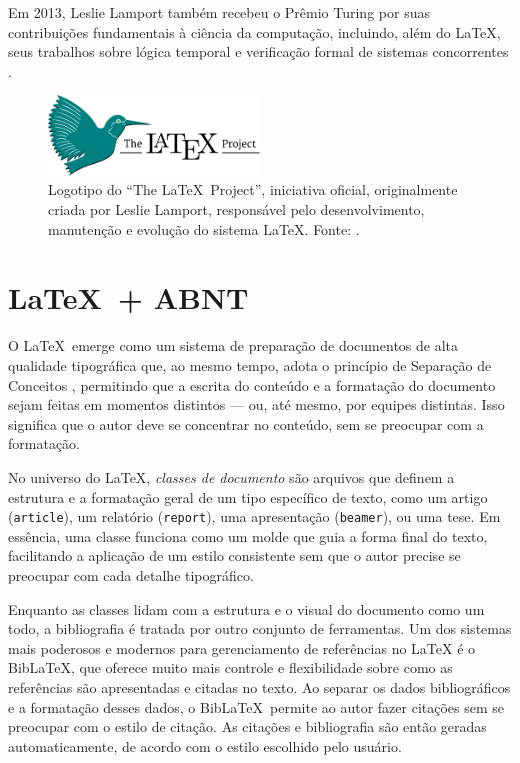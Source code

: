 Em 2013, Leslie Lamport também recebeu o Prêmio Turing por suas contribuições fundamentais à ciência da computação, incluindo, além do \LaTeX, seus trabalhos sobre lógica temporal e verificação formal de sistemas concorrentes \cite{LamportTuring2013}.

\begin{figure}
    \centering
    \includegraphics[width=0.5\textwidth]{img/LaTeX_project_logo.pdf}
    \caption{Logotipo do ``The \LaTeX\ Project'', iniciativa oficial, originalmente criada por Leslie Lamport, responsável pelo desenvolvimento, manutenção e evolução do sistema \LaTeX. Fonte: \textcite{LaTeXProjectLogo}.}
    \label{fig:latex-project-logo}
\end{figure}

\section{\LaTeX\ + ABNT} \label{sec:latex-abnt}

O \LaTeX\ emerge como um sistema de preparação de documentos de alta qualidade tipográfica que, ao mesmo tempo, adota o princípio de Separação de Conceitos \cite{Dijkstra1982}, permitindo que a escrita do conteúdo e a formatação do documento sejam feitas em momentos distintos --- ou, até mesmo, por equipes distintas. Isso significa que o autor deve se concentrar no conteúdo, sem se preocupar com a formatação.

No universo do \LaTeX{}, \emph{classes de documento} são arquivos que definem a estrutura e a formatação geral de um tipo específico de texto, como um artigo (\verb|article|), um relatório (\verb|report|), uma apresentação (\verb|beamer|), ou uma tese. Em essência, uma classe funciona como um molde que guia a forma final do texto, facilitando a aplicação de um estilo consistente sem que o autor precise se preocupar com cada detalhe tipográfico.

Enquanto as classes lidam com a estrutura e o visual do documento como um todo, a bibliografia é tratada por outro conjunto de ferramentas. Um dos sistemas mais poderosos e modernos para gerenciamento de referências no \LaTeX{} é o Bib\LaTeX, que oferece muito mais controle e flexibilidade sobre como as referências são apresentadas e citadas no texto.
Ao separar os dados bibliográficos e a formatação desses dados, o Bib\LaTeX\ permite ao autor fazer citações sem se preocupar com o estilo de citação. As citações e bibliografia são então geradas automaticamente, de acordo com o estilo escolhido pelo usuário.


